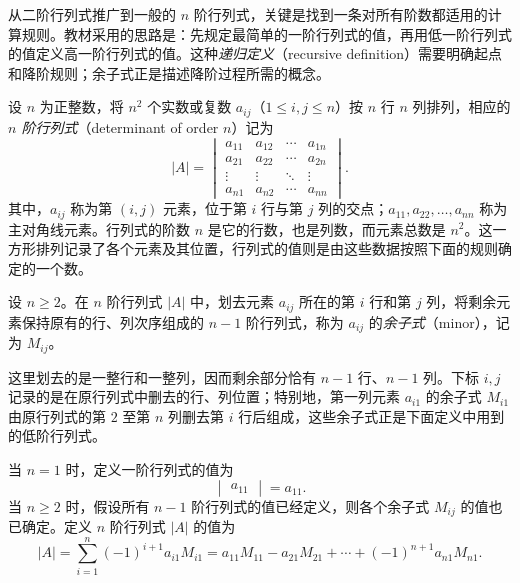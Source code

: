从二阶行列式推广到一般的 $n$ 阶行列式，关键是找到一条对所有阶数都适用的计算规则。教材采用的思路是：先规定最简单的一阶行列式的值，再用低一阶行列式的值定义高一阶行列式的值。这种\emph{递归定义}（recursive definition）需要明确起点和降阶规则；余子式正是描述降阶过程所需的概念。

设 $n$ 为正整数，将 $n^2$ 个实数或复数 $a_{ij}$（$1\leq i,j\leq n$）按 $n$ 行 $n$ 列排列，相应的\emph{$n$ 阶行列式}（determinant of order $n$）记为
\[
    |A|=
    \begin{vmatrix}
        a_{11} & a_{12} & \cdots & a_{1n} \\
        a_{21} & a_{22} & \cdots & a_{2n} \\
        \vdots & \vdots & \ddots & \vdots \\
        a_{n1} & a_{n2} & \cdots & a_{nn}
    \end{vmatrix}.
\]
其中，$a_{ij}$ 称为第 $(i,j)$ 元素，位于第 $i$ 行与第 $j$ 列的交点；$a_{11},a_{22},\ldots,a_{nn}$ 称为主对角线元素。行列式的阶数 $n$ 是它的行数，也是列数，而元素总数是 $n^2$。这一方形排列记录了各个元素及其位置，行列式的值则是由这些数据按照下面的规则确定的一个数。

\begin{definition}
\label{def:determinant-minor}
设 $n\geq 2$。在 $n$ 阶行列式 $|A|$ 中，划去元素 $a_{ij}$ 所在的第 $i$ 行和第 $j$ 列，将剩余元素保持原有的行、列次序组成的 $n-1$ 阶行列式，称为 $a_{ij}$ 的\emph{余子式}（minor），记为 $M_{ij}$。
\end{definition}

这里划去的是一整行和一整列，因而剩余部分恰有 $n-1$ 行、$n-1$ 列。下标 $i,j$ 记录的是在原行列式中删去的行、列位置；特别地，第一列元素 $a_{i1}$ 的余子式 $M_{i1}$ 由原行列式的第 $2$ 至第 $n$ 列删去第 $i$ 行后组成，这些余子式正是下面定义中用到的低阶行列式。

\begin{definition}
\label{def:determinant-recursive}
当 $n=1$ 时，定义一阶行列式的值为
\[
    \begin{vmatrix}a_{11}\end{vmatrix}=a_{11}.
\]
当 $n\geq 2$ 时，假设所有 $n-1$ 阶行列式的值已经定义，则各个余子式 $M_{ij}$ 的值也已确定。定义 $n$ 阶行列式 $|A|$ 的值为
\begin{equation}
\label{eq:determinant-first-column-definition}
    |A|=\sum_{i=1}^{n}(-1)^{i+1}a_{i1}M_{i1}
    =a_{11}M_{11}-a_{21}M_{21}+\cdots+(-1)^{n+1}a_{n1}M_{n1}.
\end{equation}
\end{definition}

